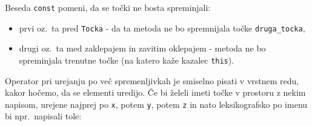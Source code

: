 Beseda \verb+const+ pomeni, da se to\v cki ne bosta spreminjali:
\begin{itemize}
	\item prvi oz.\ ta pred \verb+Tocka+ - da ta metoda ne bo spremnijala to\v cke
	\verb+druga_tocka+,
	\item drugi oz.\ ta med zaklepajem in zavitim oklepajem - metoda ne bo
	spreminjala trenutne to\v cke (na katero ka\v ze kazalec \verb+this+).
\end{itemize}

Operator pri urejanju po ve\v c spremenljivkah je smiselno pisati v vrstnem
redu, kakor ho\v cemo, da se elementi uredijo. \v Ce bi \v zeleli imeti to\v cke
v prostoru z nekim napisom, urejene najprej po \verb+x+, potem \verb+y+, potem
\verb+z+ in nato leksikografsko po imenu bi npr.\ napisali tole:

\begin{examples}


\end{examples}

